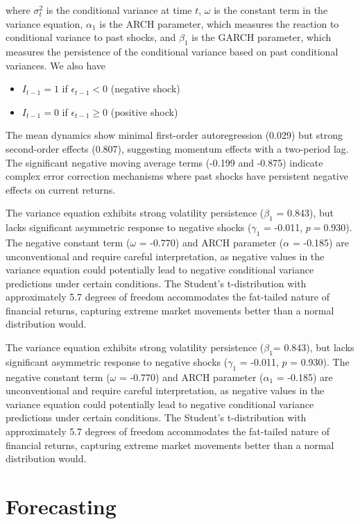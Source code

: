 where $\sigma_t^2$ is the conditional variance at time $t$, $\omega$ is the constant term in the variance equation, $\alpha_1$ is the ARCH parameter, which measures the reaction to conditional variance to past shocks, and $\beta_1$ is the GARCH parameter, which measures the persistence of the conditional variance based on past conditional variances. We also have 

\begin{itemize}
	\item $I_{t-1} = 1$ if $\epsilon_{t-1} < 0$ (negative shock)
	\item $I_{t-1} = 0$ if $\epsilon_{t-1} \geq 0$ (positive shock)
\end{itemize}
The mean dynamics show minimal first-order autoregression (0.029) but strong second-order effects (0.807), suggesting momentum effects with a two-period lag. The significant negative moving average terms (-0.199 and -0.875) indicate complex error correction mechanisms where past shocks have persistent negative effects on current returns.

The variance equation exhibits strong volatility persistence ($\beta_1$ = 0.843), but lacks significant asymmetric response to negative shocks ($\gamma_1$ = -0.011, $p = 0.930$). The negative constant term ($\omega$ = -0.770) and ARCH parameter ($\alpha$ = -0.185) are unconventional and require careful interpretation, as negative values in the variance equation could potentially lead to negative conditional variance predictions under certain conditions. The Student’s t-distribution with approximately 5.7 degrees of freedom accommodates the fat-tailed nature of financial returns, capturing extreme market movements better than a normal distribution would.

The variance equation exhibits strong volatility persistence ($\beta_1$= 0.843), but lacks significant asymmetric response to negative shocks ($\gamma_1$ = -0.011, $p$ = 0.930). The negative constant term ($\omega$ = -0.770) and ARCH parameter ($\alpha_1$ = -0.185) are unconventional and require careful interpretation, as negative values in the variance equation could potentially lead to negative conditional variance predictions under certain conditions. The Student’s t-distribution with approximately 5.7 degrees of freedom accommodates the fat-tailed nature of financial returns, capturing extreme market movements better than a normal distribution would.

\section{Forecasting}

